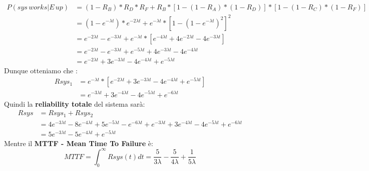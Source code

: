 \begin{equation*}
	\begin{split}
	P(sys\,works|E\,up) &= (1-R_B)*R_D*R_F + R_B*[1-(1-R_A)*(1-R_D)]*[1-(1-R_C)*(1-R_F)]  \\
	&= (1-e^{-\lambda t})*e^{-2\lambda t} + e^{-\lambda t}*[1-(1-e^{-\lambda t})^{2}]^{2} \\
	&= e^{-2\lambda t} - e^{-3\lambda t} + e^{-\lambda t}*[e^{-4\lambda t}+4e^{-2\lambda t}-4e^{-3\lambda t}] \\
	&= e^{-2\lambda t} - e^{-3\lambda t} + e^{-5\lambda t}+4e^{-3\lambda t}-4e^{-4\lambda t} \\
	&= e^{-2\lambda t} + 3e^{-3\lambda t} -4e^{-4\lambda t} +e^{-5\lambda t} 
	\end{split}
\end{equation*}
Dunque otteniamo che :
\begin{equation*}
	\begin{split}
		Rsys_1 &= e^{-\lambda t}*[e^{-2\lambda t} + 3e^{-3\lambda t} -4e^{-4\lambda t} +e^{-5\lambda t}] \\
		&=  e^{-3\lambda t} + 3e^{-4\lambda t} -4e^{-5\lambda t} +e^{-6\lambda t}
	\end{split}
\end{equation*}
Quindi la \textbf{reliability totale} del sistema sarà:
\begin{equation*}
	\begin{split}
		Rsys &= Rsys_1 + Rsys_2 \\
		&= 4e^{-3\lambda t}-8e^{-4\lambda t}+5e^{-5\lambda t}-e^{-6\lambda t} + e^{-3\lambda t} + 3e^{-4\lambda t} -4e^{-5\lambda t} +e^{-6\lambda t} \\
		&= 5e^{-3\lambda t}-5e^{-4\lambda t}+ e^{-5\lambda t}
	\end{split}
\end{equation*}
Mentre il \textbf{MTTF - Mean Time To Failure} è:
\begin{equation*}
	MTTF = \int_{0}^{\infty} Rsys(t)dt = \frac{5}{3\lambda}-\frac{5}{4\lambda}+\frac{1}{5\lambda}
\end{equation*}


